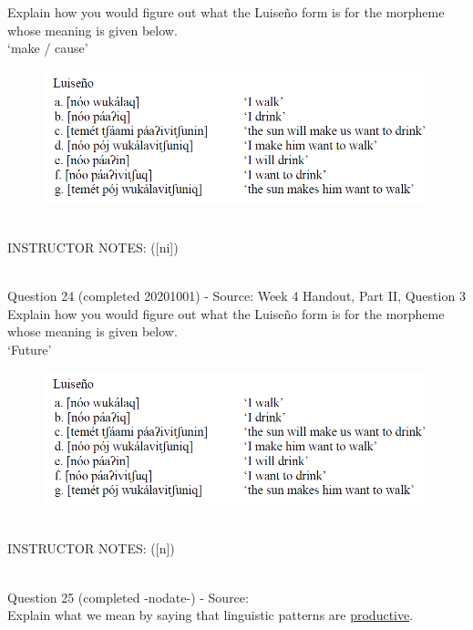\documentclass[12pt]{article}
\begin{document}
Explain how you would figure out what the Luiseño form is for the morpheme whose meaning is given below.\\

‘make / cause’

\begin{figure}[H]
\includegraphics{../images/luiseno.png}
\end{figure}

~\\
INSTRUCTOR NOTES: ([ni])


~\\

{\large Question 24} (completed 20201001) - Source: Week 4 Handout, Part II, Question 3\\

Explain how you would figure out what the Luiseño form is for the morpheme whose meaning is given below.\\

‘Future’

\begin{figure}[H]
\includegraphics{../images/luiseno.png}
\end{figure}

~\\
INSTRUCTOR NOTES: ([n])


~\\

{\large Question 25} (completed -nodate-) - Source: \\

Explain what we mean by saying that linguistic patterns are \underline{productive}.\\
\end{document}
